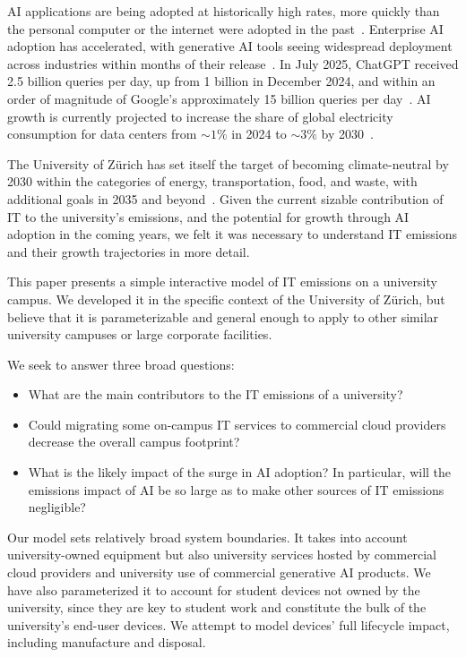 \documentclass[11pt]{article}
\let\cite\parencite
\begin{document}
AI applications are being adopted at historically high rates, more quickly than the personal computer or the internet were adopted in the past~\cite{bick:ai:adoption}. Enterprise AI adoption has accelerated, with generative AI tools seeing widespread deployment across industries within months of their release~\cite{mckinsey2024ai}. In July 2025, ChatGPT received 2.5 billion queries per day, up from 1 billion in December 2024, and within an order of magnitude of Google's approximately 15 billion queries per day~\cite{techcrunch:chatgpt}. AI growth is currently projected to increase the share of global electricity consumption for data centers from $\sim 1\%$ in 2024 to $\sim 3\%$ by 2030~\cite{iea:ai:energy}.

The University of Zürich has set itself the target of becoming climate-neutral by 2030 within the categories of energy, transportation, food, and waste, with additional goals in 2035 and beyond~\cite{uzh:sustainability:report}. Given the current sizable contribution of IT to the university's emissions, and the potential for growth through AI adoption in the coming years, we felt it was necessary to understand IT emissions and their growth trajectories in more detail.

This paper presents a simple interactive model of IT emissions on a university campus. We developed it in the specific context of the University of Zürich, but believe that it is parameterizable and general enough to apply to other similar university campuses or large corporate facilities.

We seek to answer three broad questions:
\begin{itemize}
  \item What are the main contributors to the IT emissions of a university?
  \item Could migrating some on-campus IT services to commercial cloud providers decrease the overall campus footprint?
  \item What is the likely impact of the surge in AI adoption? In particular, will the emissions impact of AI be so large as to make other sources of IT emissions negligible?
\end{itemize}

Our model sets relatively broad system boundaries. It takes into account university-owned equipment but also university services hosted by commercial cloud providers and university use of commercial generative AI products. We have also parameterized it to account for student devices not owned by the university, since they are key to student work and constitute the bulk of the university's end-user devices. We attempt to model devices' full lifecycle impact, including manufacture and disposal. 
\end{document}
